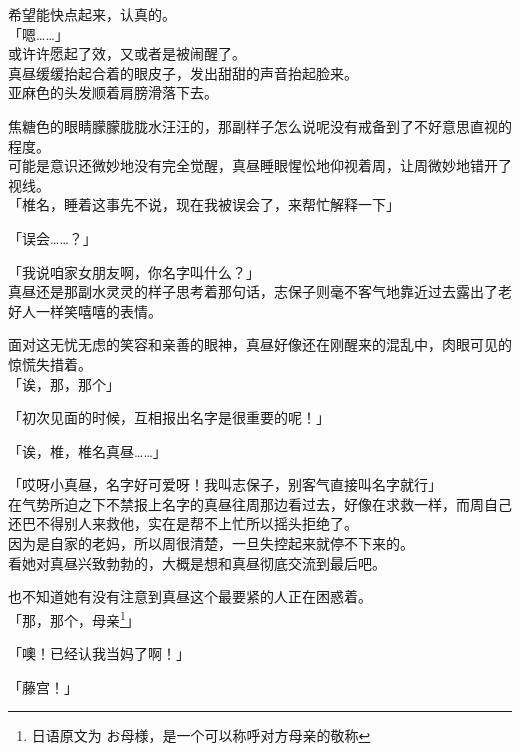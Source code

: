 希望能快点起来，认真的。\\

「嗯……」\\

或许许愿起了效，又或者是被闹醒了。\\

真昼缓缓抬起合着的眼皮子，发出甜甜的声音抬起脸来。\\

亚麻色的头发顺着肩膀滑落下去。

焦糖色的眼睛朦朦胧胧水汪汪的，那副样子怎么说呢没有戒备到了不好意思直视的程度。\\

可能是意识还微妙地没有完全觉醒，真昼睡眼惺忪地仰视着周，让周微妙地错开了视线。\\

「椎名，睡着这事先不说，现在我被误会了，来帮忙解释一下」

「误会……？」

「我说咱家女朋友啊，你名字叫什么？」\\

真昼还是那副水灵灵的样子思考着那句话，志保子则毫不客气地靠近过去露出了老好人一样笑嘻嘻的表情。

面对这无忧无虑的笑容和亲善的眼神，真昼好像还在刚醒来的混乱中，肉眼可见的惊慌失措着。\\

「诶，那，那个」

「初次见面的时候，互相报出名字是很重要的呢！」

「诶，椎，椎名真昼……」

「哎呀小真昼，名字好可爱呀！我叫志保子，别客气直接叫名字就行」\\

在气势所迫之下不禁报上名字的真昼往周那边看过去，好像在求救一样，而周自己还巴不得别人来救他，实在是帮不上忙所以摇头拒绝了。\\

因为是自家的老妈，所以周很清楚，一旦失控起来就停不下来的。\\

看她对真昼兴致勃勃的，大概是想和真昼彻底交流到最后吧。

也不知道她有没有注意到真昼这个最要紧的人正在困惑着。\\

「那，那个，母亲\footnote{日语原文为 {\jpfont お母様}，是一个可以称呼对方母亲的敬称}」

「噢！已经认我当妈了啊！」

「藤宫！」

